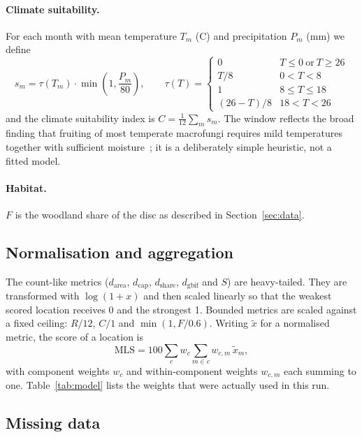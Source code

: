 \documentclass[11pt,a4paper]{article}
\begin{document}
\paragraph{Climate suitability.} For each month with mean temperature $T_m$ (\textdegree C) and precipitation
$P_m$ (mm) we define
\[
 s_m = \tau(T_m)\cdot \min\!\left(1, \frac{P_m}{80}\right),\qquad
 \tau(T)=\begin{cases}
 0 & T\le 0 \ \text{or}\ T \ge 26\\
 T/8 & 0<T<8\\
 1 & 8\le T\le 18\\
 (26-T)/8 & 18<T<26
 \end{cases}
\]
and the climate suitability index is $C=\tfrac{1}{12}\sum_m s_m$. The window reflects the broad finding
that fruiting of most temperate macrofungi requires mild temperatures together with sufficient
moisture~\cite{boddy}; it is a deliberately simple heuristic, not a fitted model.

\paragraph{Habitat.} $F$ is the woodland share of the disc as described in Section~\ref{sec:data}.

\subsection{Normalisation and aggregation}

The count-like metrics ($d_{\text{area}}$, $d_{\text{cap}}$, $d_{\text{share}}$, $d_{\text{gbif}}$ and $S$) are heavy-tailed.
They are transformed with $\log(1+x)$ and then scaled linearly so that the weakest scored location receives
0 and the strongest 1. Bounded metrics are scaled against a fixed ceiling: $R/12$, $C/1$ and
$\min(1, F/0.6)$. Writing $\tilde{x}$ for a normalised metric, the score of a location is
\[
 \text{MLS} = 100 \sum_{c} w_c \sum_{m\in c} w_{c,m}\, \tilde{x}_{m},
\]
with component weights $w_c$ and within-component weights $w_{c,m}$ each summing to one.
Table~\ref{tab:model} lists the weights that were actually used in this run.

\begin{table}[ht]
\centering\footnotesize

\caption{Components, sub-metrics and effective weights (as a share of the total score).}
\label{tab:model}
\end{table}

\subsection{Missing data}
\end{document}
